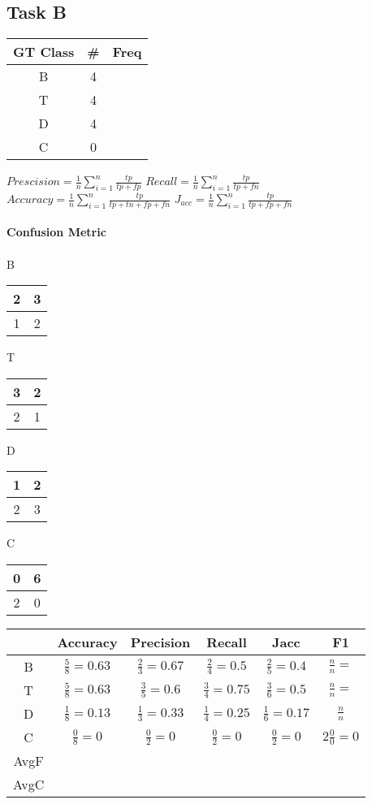 \documentclass[10pt]{article}
\begin{document}
\subsection{Task B}
\begin{center}
\begin{tabular}{ c c c }
 GT Class & \# & Freq  \\
 \hline
  B & 4  \\
 T & 4   \\
  D & 4  \\
 C & 0
\end{tabular}
\end{center}
$Prescision =\frac{1}{n}\sum_{i=1}^{n} \frac{tp}{tp+fp}$
$Recall =\frac{1}{n}\sum_{i=1}^{n} \frac{tp}{tp+fn}$
$Accuracy =\frac{1}{n}\sum_{i=1}^{n} \frac{tp}{tp+tn+fp+fn}$
$J_{acc} =\frac{1}{n}\sum_{i=1}^{n} \frac{tp}{tp+fp+fn}$
\paragraph{Confusion Metric}
\paragraph{}
\begin{center}
B \begin{tabular}{ c| c }
 2 & 3  \\
 \hline
 1& 2
\end{tabular}
 T \begin{tabular}{ c| c }
 3 & 2  \\
 \hline
 2& 1
\end{tabular}
 D \begin{tabular}{ c| c }
 1 & 2  \\
 \hline
 2& 3
\end{tabular}
 C \begin{tabular}{ c| c }
 0 & 6  \\
 \hline
 2& 0
\end{tabular}

\begin{tabular}{ c|c|c|c|c|c }
 &Accuracy & Precision & Recall&Jacc&F1 \\
 \hline
 B & $\frac{5}{8}= 0.63$ & $\frac{2}{3}=0.67$ & $\frac{2}{4}= 0.5$ & $\frac{2}{5}= 0.4$ & $\frac{n}{n}=$  \\
  \hline
 T & $\frac{5}{8} = 0.63$ & $\frac{3}{5} = 0.6$ & $\frac{3}{4} = 0.75$ & $\frac{3}{6} = 0.5$ & $\frac{n}{n} =$\\
  \hline
 D & $\frac{1}{8} = 0.13$ & $\frac{1}{3}= 0.33 $ & $\frac{1}{4}=0.25 $ & $\frac{1}{6} = 0.17$ & $\frac{n}{n}$\\
  \hline
 C & $\frac{0}{8} = 0$ & $\frac{0}{2} =0$ & $\frac{0}{2} = 0$ & $\frac{0}{2}=0$ & $2\frac{0}{0} = 0$ \\
 \hline\hline
 AvgF& && & & \\
 AvgC& & & & &

\end{tabular}
\end{center}
\end{document}
